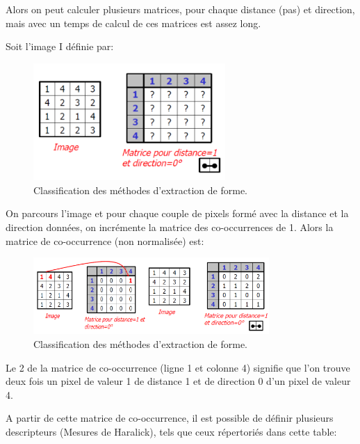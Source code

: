 Alors on peut calculer plusieurs matrices, pour chaque distance (pas) et direction, mais avec un temps de calcul de ces matrices est assez long.

Soit l’image I définie par:

\begin{figure}[H]
	\label{fig:cooc}
	\centering
	\includegraphics[width=0.65\textwidth]{Figures/cooc} %
	\caption{Classification des méthodes d’extraction de forme.}
\end{figure}

On parcours l'image et pour chaque couple de pixels formé avec la distance et la direction données, on incrémente la matrice des co-occurrences de 1. Alors la matrice de co-occurrence (non normalisée) est:

\begin{figure}[H]
	\label{fig:cooc_nn}
	\centering
	\includegraphics[width=0.8\textwidth]{Figures/cooc_non_norm} %
	\caption{Classification des méthodes d’extraction de forme.}
\end{figure}

Le 2 de la matrice de co-occurrence (ligne 1 et colonne 4) signifie que l’on trouve deux fois un pixel de valeur 1 de distance 1 et de direction
0 d’un pixel de valeur 4.

A partir de cette matrice de co-occurrence, il est possible de définir plusieurs descripteurs (Mesures de Haralick), tels que ceux répertoriés dans cette table:

